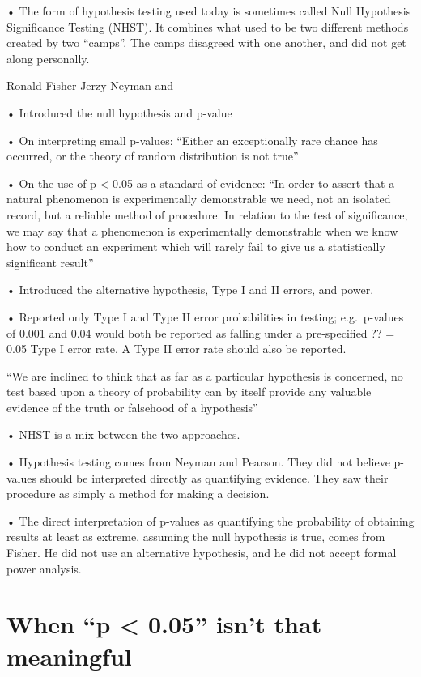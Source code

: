 \documentclass[
  letterpaper,
  DIV=11,
  numbers=noendperiod]{scrreprt}
\begin{document}
• The form of hypothesis testing used today is sometimes called Null
Hypothesis Significance Testing (NHST). It combines what used to be two
different methods created by two ``camps''. The camps disagreed with one
another, and did not get along personally.

Ronald Fisher Jerzy Neyman and

• Introduced the null hypothesis and p-value

• On interpreting small p-values: ``Either an exceptionally rare chance
has occurred, or the theory of random distribution is not true''

• On the use of p \textless{} 0.05 as a standard of evidence: ``In order
to assert that a natural phenomenon is experimentally demonstrable we
need, not an isolated record, but a reliable method of procedure. In
relation to the test of significance, we may say that a phenomenon is
experimentally demonstrable when we know how to conduct an experiment
which will rarely fail to give us a statistically significant result''

• Introduced the alternative hypothesis, Type I and II errors, and
power.

• Reported only Type I and Type II error probabilities in testing;
e.g.~p-values of 0.001 and 0.04 would both be reported as falling under
a pre-specified ?? = 0.05 Type I error rate. A Type II error rate should
also be reported.

``We are inclined to think that as far as a particular hypothesis is
concerned, no test based upon a theory of probability can by itself
provide any valuable evidence of the truth or falsehood of a
hypothesis''

• NHST is a mix between the two approaches.

• Hypothesis testing comes from Neyman and Pearson. They did not believe
p-values should be interpreted directly as quantifying evidence. They
saw their procedure as simply a method for making a decision.

• The direct interpretation of p-values as quantifying the probability
of obtaining results at least as extreme, assuming the null hypothesis
is true, comes from Fisher. He did not use an alternative hypothesis,
and he did not accept formal power analysis.

\hypertarget{when-p-0.05-isnt-that-meaningful}{%
\section{When ``p \textless{} 0.05'' isn't that
meaningful}\label{when-p-0.05-isnt-that-meaningful}}
\end{document}
